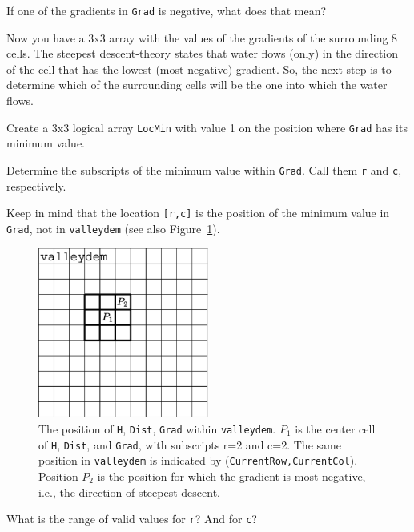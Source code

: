 \begin{action}
If one of the gradients in {\tt Grad} is negative, what does that mean?
\end{action}
Now you have a 3x3 array with the values of the gradients of the surrounding 8 cells. The steepest descent-theory states that water flows (only) in the direction of the cell that has the lowest (most negative) gradient. So, the next step is to determine which of the surrounding cells will be the one into which the water flows.
\begin{action}
Create a 3x3 logical array {\tt LocMin} with value 1 on the position where {\tt Grad} has its minimum value.
\end{action}
\begin{action}
Determine the subscripts of the minimum value within {\tt Grad}. Call them {\tt r} and {\tt c}, respectively.
\end{action}
Keep in mind that the location {\tt [r,c]} is the position of the minimum value in {\tt Grad}, not in {\tt valleydem} (see also Figure~\ref{fig:valleydem-grid}).


\begin{figure}[htb]
  \centering
    \includegraphics[width=0.5\textwidth]{./../eps/valleydem-grid.eps}
  \caption{The position of {\tt H}, {\tt Dist}, {\tt Grad} within {\tt valleydem}. $P_1$ is the center cell of {\tt H}, {\tt Dist}, and {\tt Grad}, with subscripts r=2 and c=2. The same position in {\tt valleydem} is indicated by ({\tt CurrentRow,CurrentCol}). Position $P_2$ is the position for which the gradient is most negative, i.e., the direction of steepest descent.}
  \label{fig:valleydem-grid}
\end{figure}


\begin{action}
What is the range of valid values for {\tt r}? And for {\tt c}?
\end{action}

